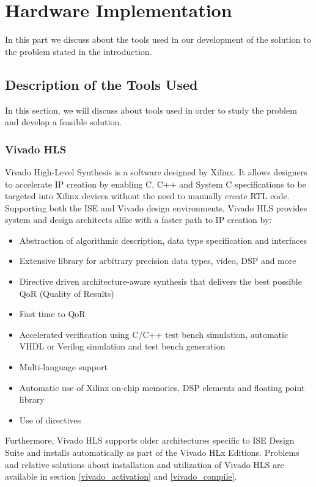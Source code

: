 \chapter{Hardware Implementation}
\label{chapter:hardware}
In this part we discuss about the tools used in our development of the solution to the problem stated in the introduction.

\section{Description of the Tools Used}

In this section, we will discuss about tools used in order to study the problem and develop a feasible solution.

\subsection{Vivado HLS}

Vivado High-Level Synthesis\cite{vivado_hls} is a software designed by Xilinx. It allows designers to accelerate IP creation by enabling C, C++ and System C specifications to be targeted into Xilinx devices without the need to manually create RTL code. Supporting both the ISE\cite{ise} and Vivado design environments, Vivado HLS provides system and design architects alike with a faster path to IP creation by:

\begin{itemize}[noitemsep]
	\item Abstraction of algorithmic description, data type specification and interfaces
	\item Extensive library for arbitrary precision data types, video, DSP and more
	\item Directive driven architecture-aware synthesis that delivers the best possible QoR (Quality of Results)
	\item Fast time to QoR
	\item Accelerated verification using C/C++ test bench simulation, automatic VHDL or Verilog simulation and test bench generation
	\item Multi-language support
	\item Automatic use of Xilinx on-chip memories, DSP elements and floating point library
	\item Use of directives
\end{itemize}
Furthermore, Vivado HLS supports older architectures specific to ISE Design Suite and installs automatically as part of the Vivado HLx Editions. Problems and relative solutions about installation and utilization of Vivado HLS are available in section \ref{vivado_activation} and \ref{vivado_compile}.

